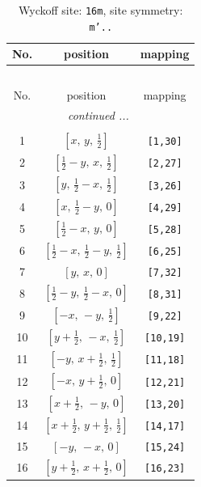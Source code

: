 \documentclass[fleqn,8pt]{jsarticle}
\begin{document}
\renewcommand{\arraystretch}{1.2}
\begin{longtable}{ccc}
\caption{Wyckoff site: {\tt 16m}, site symmetry: {\tt m'..}}
 \\
 \hline \hline
No. & position & mapping \\ \hline \endfirsthead

\multicolumn{2}{l}{\tablename\ \thetable{}} \\
 \hline \hline
No. & position & mapping \\ \hline \endhead

 \hline \hline
\multicolumn{2}{r}{\footnotesize\it continued ...} \\ \endfoot

 \hline \hline
\multicolumn{2}{r}{} \\ \endlastfoot

1 & $\left[ x,\, y,\, \frac{1}{2} \right]$ & {\tt [1,30]} \\ \hline
2 & $\left[ \frac{1}{2} - y,\, x,\, \frac{1}{2} \right]$ & {\tt [2,27]} \\ \hline
3 & $\left[ y,\, \frac{1}{2} - x,\, \frac{1}{2} \right]$ & {\tt [3,26]} \\ \hline
4 & $\left[ x,\, \frac{1}{2} - y,\, 0 \right]$ & {\tt [4,29]} \\ \hline
5 & $\left[ \frac{1}{2} - x,\, y,\, 0 \right]$ & {\tt [5,28]} \\ \hline
6 & $\left[ \frac{1}{2} - x,\, \frac{1}{2} - y,\, \frac{1}{2} \right]$ & {\tt [6,25]} \\ \hline
7 & $\left[ y,\, x,\, 0 \right]$ & {\tt [7,32]} \\ \hline
8 & $\left[ \frac{1}{2} - y,\, \frac{1}{2} - x,\, 0 \right]$ & {\tt [8,31]} \\ \hline
9 & $\left[ - x,\, - y,\, \frac{1}{2} \right]$ & {\tt [9,22]} \\ \hline
10 & $\left[ y + \frac{1}{2},\, - x,\, \frac{1}{2} \right]$ & {\tt [10,19]} \\ \hline
11 & $\left[ - y,\, x + \frac{1}{2},\, \frac{1}{2} \right]$ & {\tt [11,18]} \\ \hline
12 & $\left[ - x,\, y + \frac{1}{2},\, 0 \right]$ & {\tt [12,21]} \\ \hline
13 & $\left[ x + \frac{1}{2},\, - y,\, 0 \right]$ & {\tt [13,20]} \\ \hline
14 & $\left[ x + \frac{1}{2},\, y + \frac{1}{2},\, \frac{1}{2} \right]$ & {\tt [14,17]} \\ \hline
15 & $\left[ - y,\, - x,\, 0 \right]$ & {\tt [15,24]} \\ \hline
16 & $\left[ y + \frac{1}{2},\, x + \frac{1}{2},\, 0 \right]$ & {\tt [16,23]} \\
\end{longtable}
\end{document}
